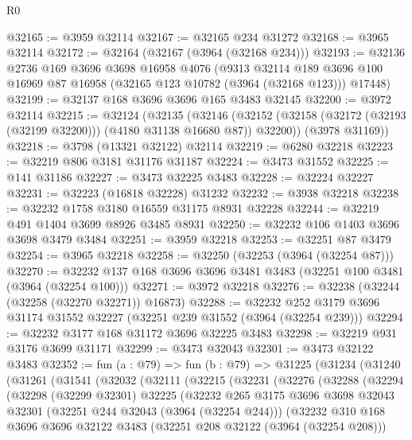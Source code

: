 \begin{lexlean}{R0}
\begin{coremodule}
@32165 := @3959 @32114
@32167 := @32165 @234 @31272
@32168 := @3965 @32114
@32172 := @32164 (@32167 (@3964 (@32168 @234)))
@32193 := @32136
    @2736
    @169
    @3696
    @3698
    @16958
    @4076
    (@9313
      @32114
      @189
      @3696
      @100
      @16969
      @87
      @16958
      (@32165 @123 @10782 (@3964 (@32168 @123)))
      @17448)
@32199 := @32137 @168 @3696 @3696 @165 @3483 @32145
@32200 := @3972 @32114
@32215 := @32124
    (@32135
      (@32146 (@32152 (@32158 (@32172 (@32193 (@32199 @32200))) (@4180 @31138 @16680 @87)) @32200))
      (@3978 @31169))
@32218 := @3798 (@13321 @32122) @32114
@32219 := @6280 @32218
@32223 := @32219 @806 @3181 @31176 @31187
@32224 := @3473 @31552
@32225 := @141 @31186
@32227 := @3473 @32225 @3483
@32228 := @32224 @32227
@32231 := @32223 (@16818 @32228) @31232
@32232 := @3938 @32218
@32238 := @32232 @1758 @3180 @16559 @31175 @8931 @32228
@32244 := @32219 @491 @1404 @3699 @8926 @3485 @8931
@32250 := @32232 @106 @1403 @3696 @3698 @3479 @3484
@32251 := @3959 @32218
@32253 := @32251 @87 @3479
@32254 := @3965 @32218
@32258 := @32250 (@32253 (@3964 (@32254 @87)))
@32270 := @32232 @137 @168 @3696 @3696 @3481 @3483 (@32251 @100 @3481 (@3964 (@32254 @100)))
@32271 := @3972 @32218
@32276 := @32238 (@32244 (@32258 (@32270 @32271)) @16873)
@32288 := @32232 @252 @3179 @3696 @31174 @31552 @32227 (@32251 @239 @31552 (@3964 (@32254 @239)))
@32294 := @32232 @3177 @168 @31172 @3696 @32225 @3483
@32298 := @32219 @931 @3176 @3699 @31171
@32299 := @3473 @32043
@32301 := @3473 @32122 @3483
@32352 := fun (a : @79) =>
  fun (b : @79) =>
  @31225
    (@31234
      (@31240
        (@31261
          (@31541
            (@32032
              (@32111
                (@32215
                  (@32231
                    (@32276
                      (@32288
                        (@32294
                          (@32298
                            (@32299 @32301)
                            @32225
                            (@32232
                              @265
                              @3175
                              @3696
                              @3698
                              @32043
                              @32301
                              (@32251 @244 @32043 (@3964 (@32254 @244)))
                              (@32232
                                @310
                                @168
                                @3696
                                @3696
                                @32122
                                @3483
                                (@32251 @208 @32122 (@3964 (@32254 @208)))

\end{coremodule}
\end{lexlean}
